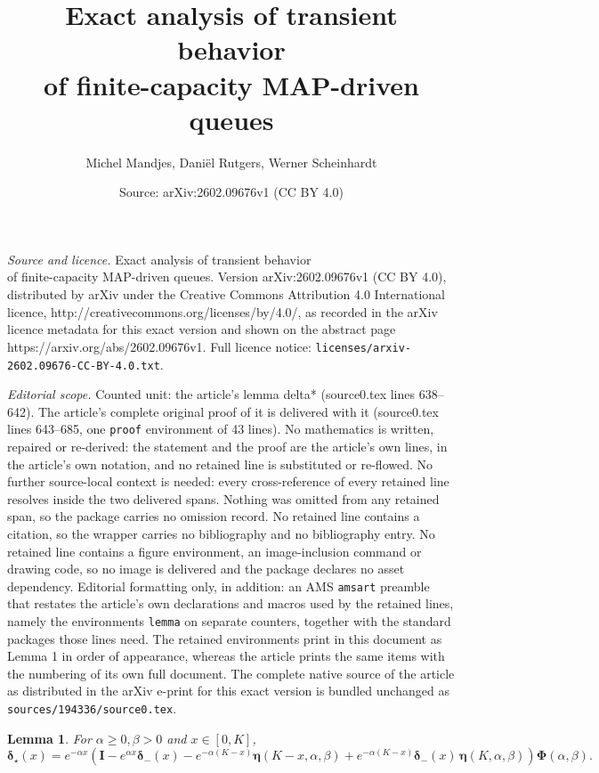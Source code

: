 \documentclass[10pt,a4paper]{amsart}
\title{Exact analysis of transient behavior\\ of finite-capacity MAP-driven queues}
\author{Michel Mandjes, Dani\"el Rutgers, Werner Scheinhardt}
\date{Source: arXiv:2602.09676v1 (CC BY 4.0)}
\newtheorem{lemma}{Lemma}
\newcommand{\bs}{\boldsymbol}
\begin{document}
\maketitle

\noindent\emph{Source and licence.} Exact analysis of transient behavior\\ of finite-capacity MAP-driven queues. Version arXiv:2602.09676v1 (CC BY 4.0), distributed by arXiv under the Creative Commons Attribution 4.0 International licence, http://creativecommons.org/licenses/by/4.0/, as recorded in the arXiv licence metadata for this exact version and shown on the abstract page https://arxiv.org/abs/2602.09676v1. Full licence notice: \texttt{licenses/arxiv-2602.09676-CC-BY-4.0.txt}.\par\smallskip

\noindent\textit{Editorial scope.} Counted unit: the article's lemma delta* (source0.tex lines 638--642). The article's complete original proof of it is delivered with it (source0.tex lines 643--685, one \texttt{proof} environment of 43 lines). No mathematics is written, repaired or re-derived: the statement and the proof are the article's own lines, in the article's own notation, and no retained line is substituted or re-flowed.  No further source-local context is needed: every cross-reference of every retained line resolves inside the two delivered spans.  Nothing was omitted from any retained span, so the package carries no omission record.  No retained line contains a citation, so the wrapper carries no bibliography and no bibliography entry.  No retained line contains a figure environment, an image-inclusion command or drawing code, so no image is delivered and the package declares no asset dependency.  Editorial formatting only, in addition: an AMS \texttt{amsart} preamble that restates the article's own declarations and macros used by the retained lines, namely the environments \texttt{lemma} on separate counters, together with the standard packages those lines need.  The retained environments print in this document as Lemma 1 in order of appearance, whereas the article prints the same items with the numbering of its own full document.  The complete native source of the article as distributed in the arXiv e-print for this exact version is bundled unchanged as \texttt{sources/194336/source0.tex}.
\begin{lemma}\label{lemma: delta*} For $\alpha \geqslant0, \beta>0$ and $x\in[0,K]$,
    \begin{equation}\label{eq: delta*}
        \bs\delta_\star(x) = e^{-\alpha x}\left( \bs{I} - e^{\alpha x}\bs\delta_-(x) - e^{-\alpha(K-x)}\bs\eta(K-x,\alpha,\beta) + e^{-\alpha(K-x)}\bs\delta_-(x)\,\bs\eta(K,\alpha,\beta) \right)\bs\Phi(\alpha,\beta).
    \end{equation}
\end{lemma}
\end{document}
